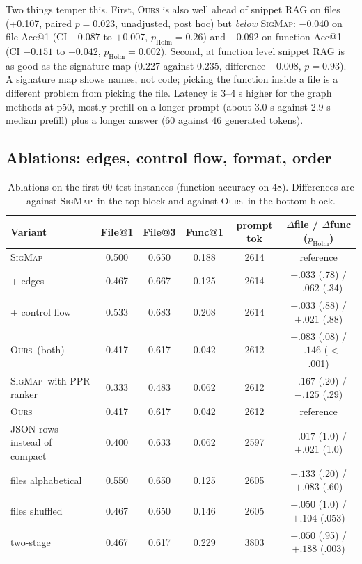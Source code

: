 \documentclass[10pt]{article}
\newcommand{\sig}{\textsc{SigMap}}
\newcommand{\ours}{\textsc{Ours}}
\begin{document}
Two things temper this. First, \ours{} is also well ahead of snippet RAG on files (+0.107, paired $p=0.023$, unadjusted, post hoc) but \emph{below} \sig{}: $-0.040$ on file Acc@1 (CI $-0.087$ to $+0.007$, $p_{\text{Holm}}=0.26$) and $-0.092$ on function Acc@1 (CI $-0.151$ to $-0.042$, $p_{\text{Holm}}=0.002$). Second, at function level snippet RAG is as good as the signature map (0.227 against 0.235, difference $-0.008$, $p=0.93$). A signature map shows names, not code; picking the function inside a file is a different problem from picking the file. Latency is 3--4 s higher for the graph methods at p50, mostly prefill on a longer prompt (about 3.0 s against 2.9 s median prefill) plus a longer answer (60 against 46 generated tokens).

\subsection{Ablations: edges, control flow, format, order}
\begin{table}[t]\centering\small
\caption{Ablations on the first 60 test instances (function accuracy on 48). Differences are against \sig\ in the top block and against \ours\ in the bottom block.}\label{tab:abl}
\begin{tabular}{@{}lccccc@{}}\toprule
Variant & File@1 & File@3 & Func@1 & prompt tok & $\Delta$file / $\Delta$func ($p_{\text{Holm}}$)\\\midrule
\sig\ & 0.500 & 0.650 & 0.188 & 2614 & reference\\
\; + edges & 0.467 & 0.667 & 0.125 & 2614 & $-.033$ (.78) / $-.062$ (.34)\\
\; + control flow & 0.533 & 0.683 & 0.208 & 2614 & $+.033$ (.88) / $+.021$ (.88)\\
\; \ours\ (both) & 0.417 & 0.617 & 0.042 & 2612 & $-.083$ (.08) / $-.146$ ($<$.001)\\
\; \sig\ with PPR ranker & 0.333 & 0.483 & 0.062 & 2612 & $-.167$ (.20) / $-.125$ (.29)\\\midrule
\ours\ & 0.417 & 0.617 & 0.042 & 2612 & reference\\
\; JSON rows instead of compact & 0.400 & 0.633 & 0.062 & 2597 & $-.017$ (1.0) / $+.021$ (1.0)\\
\; files alphabetical & 0.550 & 0.650 & 0.125 & 2605 & $+.133$ (.20) / $+.083$ (.60)\\
\; files shuffled & 0.467 & 0.650 & 0.146 & 2605 & $+.050$ (1.0) / $+.104$ (.053)\\
\; two-stage & 0.467 & 0.617 & 0.229 & 3803 & $+.050$ (.95) / $+.188$ (.003)\\\bottomrule
\end{tabular}\end{table}
\end{document}
